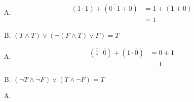 {{        %
        \begin{practices}
            \begin{enumerate}[A.]
                \item
                {
                    \begin{align*}
                        (1 \cdot 1) + (\overline{0 \cdot 1} + 0)
                        &= 1 + (1 + 0) \\
                        &= 1
                    \end{align*}
                }
                \item
                {
                    $(T \wedge T) \vee (\neg (F \wedge T) \vee F) = T$
                }
            \end{enumerate}
        \end{practices}

        \begin{practices}
            \begin{enumerate}[A.]
                \item
                {
                    \begin{align*}
                        (\bar{1} \cdot \bar{0}) + (1 \cdot \bar{0})
                        &= 0 + 1 \\
                        &= 1
                    \end{align*}
                }
                \item
                {
                    $(\neg T \wedge \neg F) \vee (T \wedge \neg F) = T$
                }
            \end{enumerate}
        \end{practices}

        \begin{practices}
            \begin{enumerate}[A.]
                \item
                {
                    \begin{table}[H]
                        \centering


\end{table}}
\end{enumerate}
\end{practices}}}
